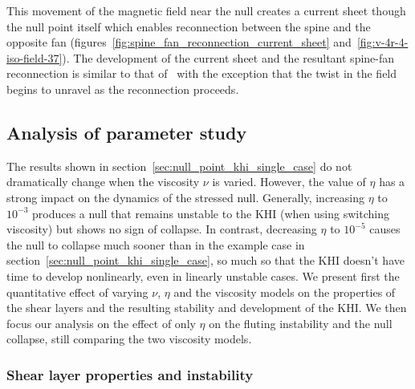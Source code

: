 This movement of the magnetic field near the null creates a current sheet though the null point itself which enables reconnection between the spine and the opposite fan (figures~\ref{fig:spine_fan_reconnection_current_sheet} and~\ref{fig:v-4r-4-iso-field-37}). The development of the current sheet and the resultant spine-fan reconnection is similar to that of~\cite{pontinCurrentSheetFormation2007} with the exception that the twist in the field begins to unravel as the reconnection proceeds. 

\subsection{Analysis of parameter study}

The results shown in section~\ref{sec:null_point_khi_single_case} do not dramatically change when the viscosity $\nu$ is varied. However, the value of $\eta$ has a strong impact on the dynamics of the stressed null. Generally, increasing $\eta$ to $10^{-3}$ produces a null that remains unstable to the KHI (when using switching viscosity) but shows no sign of collapse. In contrast, decreasing $\eta$ to $10^{-5}$ causes the null to collapse much sooner than in the example case in section~\ref{sec:null_point_khi_single_case}, so much so that the KHI doesn't have time to develop nonlinearly, even in linearly unstable cases. We present first the quantitative effect of varying $\nu$, $\eta$ and the viscosity models on the properties of the shear layers and the resulting stability and development of the KHI. We then focus our analysis on the effect of only $\eta$ on the fluting instability and the null collapse, still comparing the two viscosity models.


\subsubsection{Shear layer properties and instability}

